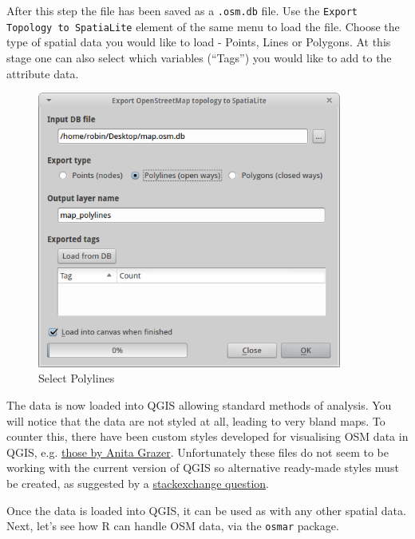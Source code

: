 \documentclass[]{article}
\let\Oldincludegraphics\includegraphics
\renewcommand{\includegraphics}[1]{\Oldincludegraphics[width=10cm]{#1}}
\begin{document}
After this step the file has been saved as a \texttt{.osm.db} file. Use
the \texttt{Export Topology to SpatiaLite} element of the same menu to
load the file. Choose the type of spatial data you would like to load -
Points, Lines or Polygons. At this stage one can also select which
variables (``Tags'') you would like to add to the attribute data.

\begin{figure}[htbp]
\centering
\includegraphics{osmfigs/open-osmdb.png}
\caption{Select Polylines}
\end{figure}

The data is now loaded into QGIS allowing standard methods of analysis.
You will notice that the data are not styled at all, leading to very
bland maps. To counter this, there have been custom styles developed for
visualising OSM data in QGIS, e.g.
\href{http://anitagraser.com/2012/02/25/light-styles-for-osm-layers-in-qgis/}{those
by Anita Grazer}. Unfortunately these files do not seem to be working
with the current version of QGIS so alternative ready-made styles must
be created, as suggested by a
\href{http://gis.stackexchange.com/questions/42645/is-there-up-to-date-osm-sld-file-for-geoserver}{stackexchange
question}.

Once the data is loaded into QGIS, it can be used as with any other
spatial data. Next, let's see how R can handle OSM data, via the
\texttt{osmar} package.
\end{document}

